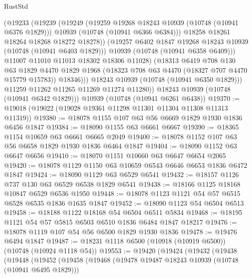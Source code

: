 \begin{lexlean}{RustStd}
\begin{coremodule}
                    (@19233
                      (@19239
                        (@19249
                          (@19259 @19268 @18243 @10939 (@10748 (@10941 @6376 @1829)))
                          @10939
                          (@10748 (@10941 @6366 @6384)))
                        @18258
                        @18261
                        @18264
                        @18268
                        @18272
                        @18278))
                    (@19257 @6402 @1847 @19268 @18243 @10939 (@10748 (@10941 @6403 @1829)))
                    @10939
                    (@10748 (@10941 @6358 @6409)))
                  @11007
                  @11010
                  @11013
                  @18302
                  @18306
                  @11028)
                (@18313
                  @6419
                  @708
                  @130
                  @63
                  @1829
                  @4470
                  @1829
                  @1968
                  (@18323 @708 @63 @4470 (@18327 @707 @4470 @15779 @15783))
                  @18346)))
            @18243
            @10939
            (@10748 (@10941 @6350 @1829)))
          @11259
          @11262
          @11265
          @11269
          @11274
          @11280))
      @18243
      @10939
      (@10748 (@10941 @6342 @1829)))
    @10939
    (@10748 (@10941 @6261 @6438))
@19370 := @19018 (@19022 (@19028 @19361 @11298 @11301 @11304 @11308 @11313 @11319))
@19380 := @18078 @1155 @107 @63 @56 @6669 @1829 @1930 @1836 @6456 @1847
@19384 := @18090 @1155 @63 @6661 @6667
@19390 := @18365 @1154 @10659 @63 @6661 @6665 @2049
@19400 := @18078 @1152 @107 @63 @56 @6658 @1829 @1930 @1836 @6464 @1847
@19404 := @18090 @1152 @63 @6647 @6656
@19410 := @18070 @1151 @10660 @63 @6647 @6654 @2065
@19420 := @18078 @1129 @1150 @63 @10659 @6543 @6646 @6653 @1836 @6472 @1847
@19424 := @18090 @1129 @63 @6529 @6541
@19432 := @18157 @1126 @737 @130 @63 @6529 @6538 @1829 @6541
@19438 := @18166 @1125 @18168 @10847 @6529 @6536 @1950
@19448 := @18078 @1123 @1121 @54 @57 @6515 @6528 @6535 @1836 @1635 @1847
@19452 := @18090 @1123 @54 @6504 @6513
@19458 := @18188 @1122 @18168 @54 @6504 @6511 @5834
@19468 := @18195 @1121 @54 @57 @5815 @6503 @6510 @1836 @6484 @1847 @18217
@19476 := @18078 @1119 @107 @54 @56 @6500 @1829 @1930 @1836
@19478 := @19476 @6494 @1847
@19487 := @18231 @1118 @6500 (@10918 (@10919 @6500)) (@10748 (@10924 @1118 @54))
@19553 := @19420
    (@19424
      (@19432
        (@19438
          (@19448
            (@19452
              (@19458
                (@19468
                  (@19478 @19487 @18243 @10939 (@10748 (@10941 @6495 @1829)))

\end{coremodule}
\end{lexlean}
